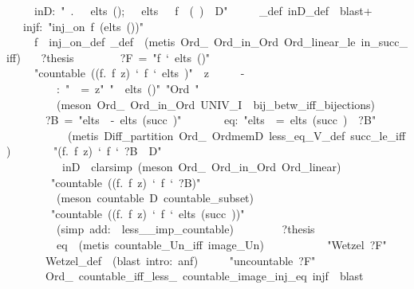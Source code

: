 \documentclass[runningheads]{llncs}
\begin{document}
\begin{isabelle}
\ \ \ \ \ inD:\ "\isasymAnd \isasymalpha \ \isasymbeta .\ \isasymlbrakk \isasymbeta \ \isasymin \ elts\ ();\ \isasymalpha \ \isasymin \ elts\ \isasymbeta \isasymrbrakk \ \isasymLongrightarrow \ f\ \isasymbeta \ (\isasymzeta \ \isasymalpha )\ \isasymin \ D"\isanewline
\ \ \ \ \ \isasymPhi \_def\ inD\_def\ \ blast+\isanewline
\ \ \ injf:\ "inj\_on\ f\ (elts\ ())"\isanewline
\ \ \ \ \ \isasymPhi f\ \ inj\_on\_def\ \isasymPhi \_def\ \ (metis\ Ord\_\ Ord\_in\_Ord\ Ord\_linear\_le\ in\_succ\_iff)\isanewline
\ \ \ ?thesis\isanewline
\ \ \isanewline
\ \ \ \ \ ?F\ =\ "f\ `\ elts\ ()"\isanewline
\ \ \ \ \ "countable\ ((\isasymlambda f.\ f\ z)\ `\ f\ `\ elts\ )"\ \ z\isanewline
\ \ \ \ \ -\isanewline
\ \ \ \ \ \ \ \isasymalpha \ \ \isasymalpha :\ "\isasymzeta \ \isasymalpha \ =\ z"\ "\isasymalpha \ \isasymin \ elts\ ()"\ "Ord\ \isasymalpha "\isanewline
\ \ \ \ \ \ \ \ \ (meson\ Ord\_\ Ord\_in\_Ord\ UNIV\_I\ \isasymzeta \ bij\_betw\_iff\_bijections)\isanewline
\ \ \ \ \ \ \ ?B\ =\ "elts\ \ -\ elts\ (succ\ \isasymalpha )"\isanewline
\ \ \ \ \ \ \ eq:\ "elts\ \ =\ elts\ (succ\ \isasymalpha )\ \isasymunion \ ?B"\isanewline
\ \ \ \ \ \ \ \ \ \isasymalpha \ \ (metis\ Diff\_partition\ Ord\_\ OrdmemD\ less\_eq\_V\_def\ succ\_le\_iff)\isanewline
\ \ \ \ \ \ \ "(\isasymlambda f.\ f\ z)\ `\ f\ `\ ?B\ \isasymsubseteq \ D"\isanewline
\ \ \ \ \ \ \ \ \ \isasymalpha \ inD\ \ clarsimp\ (meson\ Ord\_\ Ord\_in\_Ord\ Ord\_linear)\isanewline
\ \ \ \ \ \ \ \ "countable\ ((\isasymlambda f.\ f\ z)\ `\ f\ `\ ?B)"\isanewline
\ \ \ \ \ \ \ \ \ (meson\ \isacartoucheopen countable\ D\isacartoucheclose \ countable\_subset)\isanewline
\ \ \ \ \ \ \ \ "countable\ ((\isasymlambda f.\ f\ z)\ `\ f\ `\ elts\ (succ\ \isasymalpha ))"\isanewline
\ \ \ \ \ \ \ \ \ (simp\ add:\ \isasymalpha \ less\_\_imp\_countable)\isanewline
\ \ \ \ \ \ \ \ ?thesis\isanewline
\ \ \ \ \ \ \ \ \ eq\ \ (metis\ countable\_Un\_iff\ image\_Un)\isanewline
\ \ \ \ \isanewline
\ \ \ \ \ \ "Wetzel\ ?F"\isanewline
\ \ \ \ \ \ \ Wetzel\_def\ \ (blast\ intro:\ anf)\isanewline
\ \ \ \ \ "uncountable\ ?F"\isanewline
\ \ \ \ \ \ \ Ord\_\ countable\_iff\_less\_\ countable\_image\_inj\_eq\ injf\ \ blast\isanewline
\ \ 
\end{isabelle}
\end{document}
